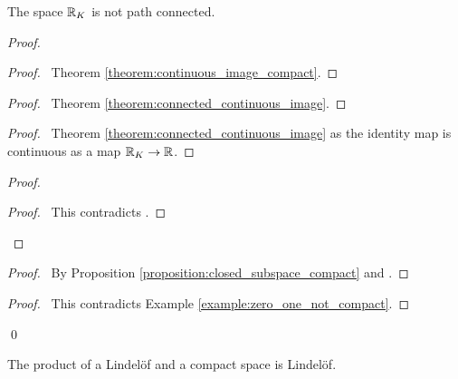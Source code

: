 \begin{example}
    The space $\mathbb{R}_K$ is not path connected.
\end{example}

\begin{proof}
    \pf
    \begin{proof}
        \pf\ Theorem \ref{theorem:continuous_image_compact}.
    \end{proof}
    \begin{proof}
        \pf\ Theorem \ref{theorem:connected_continuous_image}.
    \end{proof}
    \begin{proof}
        \pf\ Theorem \ref{theorem:connected_continuous_image} as
        the identity map is continuous as a map $\mathbb{R}_K \rightarrow \mathbb{R}$.
    \end{proof}
    \begin{proof}
        \qedstep
        \begin{proof}
            \pf\ This contradicts .
        \end{proof}
    \end{proof}
    \begin{proof}
        \pf\ By Proposition \ref{proposition:closed_subspace_compact}
        and .
    \end{proof}
    \qedstep
    \begin{proof}
        \pf\ This contradicts Example \ref{example:zero_one_not_compact}.
    \end{proof}
    \qed
\end{proof}

\begin{proposition}[Choice]
    The product of a Lindel\"{o}f and a compact space is Lindel\"{o}f.
\end{proposition}

